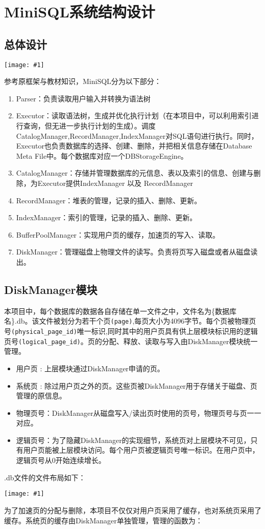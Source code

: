 \documentclass[12pt, a4paper]{article}
\def\c#1{\texttt{#1}}
\def\s#1{\section{#1}}
\def\ss#1{\subsection{#1}}
\def\p{\par}
\def\g#1{\begin{center}\texttt{[image: \#1]}\end{center}}
\begin{document}
\s{MiniSQL系统结构设计}
\ss{总体设计}
\g {imgs/structure_1.png}
\p 参考原框架与教材知识，MiniSQL分为以下部分：
\begin{enumerate}
  \item Parser：负责读取用户输入并转换为语法树
  \item Executor：读取语法树，生成并优化执行计划（在本项目中，可以利用索引进行查询，但无进一步执行计划的生成）。调度CatalogManager,RecordManager,IndexManager对SQL语句进行执行。同时，Executor也负责数据库的选择、创建、删除，并把相关信息存储在Database Meta File中。每个数据库对应一个DBStorageEngine。
  \item CatalogManager：存储并管理数据库的元信息、表以及索引的信息、创建与删除，为Executor提供IndexManager 以及 RecordManager
  \item RecordManager：堆表的管理，记录的插入、删除、更新。
  \item IndexManager：索引的管理，记录的插入、删除、更新。
  \item BufferPoolManager：实现用户页的缓存，加速页的写入、读取。
  \item DiskManager：管理磁盘上物理文件的读写。负责将页写入磁盘或者从磁盘读出。
\end{enumerate}
\ss{DiskManager模块}
本项目中，每个数据库的数据各自存储在单一文件之中，文件名为\{数据库名\}.db。该文件被划分为若干个页\c{(page)},每页大小为4096字节。每个页被物理页号\c{(physical\_page\_id)}唯一标识,同时其中的用户页具有供上层模块标识用的逻辑页号\c{(logical\_page\_id)}。页的分配、释放、读取与写入由DiskManager模块统一管理。
\begin{itemize}
	\item 用户页 : 上层模块通过DiskManager申请的页。
 \item 系统页 : 除过用户页之外的页。这些页被DiskManager用于存储关于磁盘、页管理的原信息。
 \item 物理页号：DiskManager从磁盘写入/读出页时使用的页号，物理页号与页一一对应。
 \item 逻辑页号：为了隐藏DiskManager的实现细节，系统页对上层模块不可见，只有用户页能被上层模块访问。每个用户页被逻辑页号唯一标识。在用户页中，逻辑页号从0开始连续增长。
\end{itemize}
\p .db文件的文件布局如下：
\g{file_layout.pdf}
\p 为了加速页的分配与删除，本项目不仅仅对用户页采用了缓存，也对系统页采用了缓存。系统页的缓存由DiskManager单独管理，管理的函数为：
\end{document}
